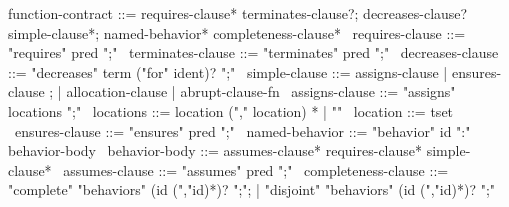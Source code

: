 \begin{syntax}
  function-contract ::= requires-clause* terminates-clause?;
                        decreases-clause? simple-clause*;
                        named-behavior* completeness-clause*
  \
  requires-clause ::= "requires" pred ";"
  \
  terminates-clause ::= "terminates" pred ";"
  \
  decreases-clause ::= "decreases" term ("for" ident)? ";"
  \
  simple-clause ::= assigns-clause | ensures-clause ;
                | allocation-clause | abrupt-clause-fn 
  \
  assigns-clause ::= "assigns" locations ";"
  \
  locations ::= location ("," location) * | "\nothing"
  \
  location ::= tset
  \
  ensures-clause ::= "ensures" pred ";"
  \
  named-behavior ::= "behavior" id ":" behavior-body
  \
  behavior-body ::= assumes-clause* requires-clause* simple-clause* 
  \
  assumes-clause ::= "assumes" pred ";"
  \
  completeness-clause ::= "complete" "behaviors" (id (","id)*)? ";";
     | "disjoint" "behaviors" (id (","id)*)? ";"
\end{syntax}
